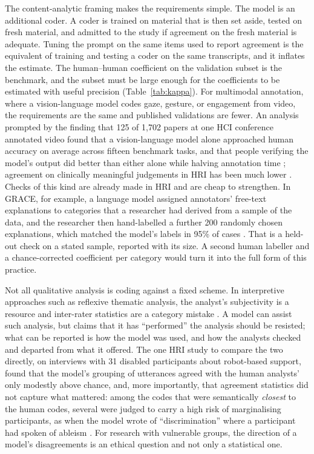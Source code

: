 The content-analytic framing makes the requirements simple. The model is an
additional coder. A coder is trained on material that is then set aside,
tested on fresh material, and admitted to the study if agreement on the fresh
material is adequate. Tuning the prompt on the same items used to report
agreement is the equivalent of training and testing a coder on the same
transcripts, and it inflates the estimate. The human--human coefficient on
the validation subset is the benchmark, and the subset must be large enough
for the coefficients to be estimated with useful precision
(Table~\ref{tab:kappa}). For multimodal annotation, where a vision-language
model codes gaze, gesture, or engagement from video, the requirements are the
same and published validations are fewer. An analysis prompted by the
finding that 125 of 1{,}702 papers at one HCI conference annotated video
found that a vision-language model alone approached human accuracy on
average across fifteen benchmark tasks, and that people verifying the
model's output did better than either alone while halving annotation time
\cite{shen2026can}; agreement on clinically meaningful judgements in HRI
has been much lower \cite{abbasi2025robotled}. Checks of this kind are
already made in HRI and are cheap to strengthen. In GRACE, for example, a
language model assigned annotators' free-text explanations to categories
that a researcher had derived from a sample of the data, and the researcher
then hand-labelled a further 200 randomly chosen explanations, which matched
the model's labels in 95\% of cases \cite{dogan2025grace}. That is a held-out
check on a stated sample, reported with its size. A second human labeller
and a chance-corrected coefficient per category would turn it into the full
form of this practice.

Not all qualitative analysis is coding against a fixed scheme. In
interpretive approaches such as reflexive thematic analysis, the analyst's
subjectivity is a resource and inter-rater statistics are a category mistake
\cite{braun2019reflecting,mcdonald2019reliability}. A model can assist such
analysis, but claims that it has ``performed'' the analysis should be
resisted; what can be reported is how the model was used, and how the
analysts checked and departed from what it offered. The one HRI study to
compare the two directly, on interviews with 31 disabled participants about
robot-based support, found that the model's grouping of utterances agreed
with the human analysts' only modestly above chance, and, more importantly,
that agreement statistics did not capture what mattered: among the codes
that were semantically \emph{closest} to the human codes, several were
judged to carry a high risk of marginalising participants, as when the
model wrote of ``discrimination'' where a participant had spoken of ableism
\cite{markelius2026evaluating}. For research with vulnerable groups, the
direction of a model's disagreements is an ethical question and not only a
statistical one.

